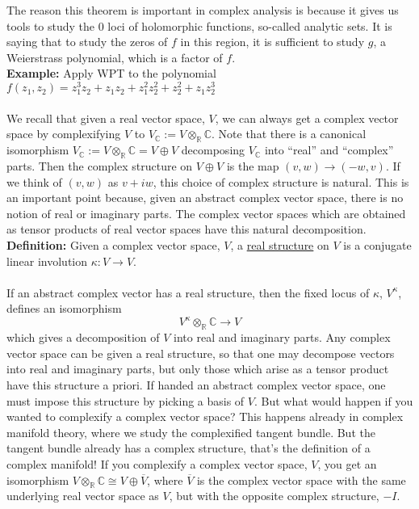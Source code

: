 \documentclass[12pt]{report}
\theoremstyle{definition}
\theoremstyle{remark}
\numberwithin{equation}{section}
\theoremstyle{definition}
\newcommand{\bb}[1]{\mathbb{#1}}
\begin{document}
The reason this theorem is important in complex analysis is because it gives us tools to study the 0 loci of holomorphic functions, so-called analytic sets. It is saying that to study the zeros of $f$ in this region, it is sufficient to study $g$, a Weierstrass polynomial, which is a factor of $f$. \\
\textbf{Example: }Apply WPT to the polynomial $f(z_1,z_2) = z_1^3z_2 + z_1z_2 + z_1^2z_2^2 + z_2^2 + z_1z_2^3$\\\\
We recall that given a real vector space, $V$, we can always get a complex vector space by complexifying $V$ to $V_\bb C := V \otimes_ \bb R \bb C$. Note that there is a canonical isomorphism $V_\bb C := V \otimes_ \bb R \bb C = V \oplus V$ decomposing $V_\bb C$ into ``real'' and ``complex'' parts. Then the complex structure on $V \oplus V$ is the map $(v,w) \to (-w,v)$. If we think of $(v,w)$ as $v + iw$, this choice of complex structure is natural. This is an important point because, given an abstract complex vector space, there is no notion of real or imaginary parts. The complex vector spaces which are obtained as tensor products of real vector spaces have this natural decomposition. \\
\textbf{Definition: }Given a complex vector space, $V$, a \underline{real structure} on $V$ is a conjugate linear involution $\kappa: V \to V$. \\\\
If an abstract complex vector has a real structure, then the fixed locus of $\kappa$, $V^\kappa$, defines an isomorphism 
$$
	V^\kappa \otimes_{\bb R} \bb C \to V
$$
which gives a decomposition of $V$ into real and imaginary parts. Any complex vector space can be given a real structure, so that one may decompose vectors into real and imaginary parts, but only those which arise as a tensor product have this structure a priori. If handed an abstract complex vector space, one must impose this structure by picking a basis of $V$. But what would happen if you wanted to complexify a complex vector space? This happens already in complex manifold theory, where we study the complexified tangent bundle. But the tangent bundle already has a complex structure, that's the definition of a complex manifold! If you complexify a complex vector space, $V$, you get an isomorphism $V \otimes _ \bb R \bb C \cong
V \oplus \overline V$, where $\overline V$ is the complex vector space with the same underlying real vector space as $V$, but with the opposite complex structure, $-I$.\\
\end{document}
